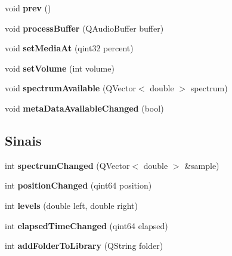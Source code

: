 \begin{DoxyCompactItemize}
\item 
\hypertarget{class_main_window_a56270e72e4ec5e058a040657932069cf}{void {\bfseries prev} ()}\label{class_main_window_a56270e72e4ec5e058a040657932069cf}

\item 
\hypertarget{class_main_window_a5c459d00d64786ef93db7670034af47d}{void {\bfseries process\-Buffer} (Q\-Audio\-Buffer buffer)}\label{class_main_window_a5c459d00d64786ef93db7670034af47d}

\item 
\hypertarget{class_main_window_aedb83314811efab4ea67c69cbce29aea}{void {\bfseries set\-Media\-At} (qint32 percent)}\label{class_main_window_aedb83314811efab4ea67c69cbce29aea}

\item 
\hypertarget{class_main_window_aeb9309a7fe8efd574fe5b7ac92ba2a92}{void {\bfseries set\-Volume} (int volume)}\label{class_main_window_aeb9309a7fe8efd574fe5b7ac92ba2a92}

\item 
\hypertarget{class_main_window_a9efd699e3eaed3396733475499297bc0}{void {\bfseries spectrum\-Available} (Q\-Vector$<$ double $>$ spectrum)}\label{class_main_window_a9efd699e3eaed3396733475499297bc0}

\item 
\hypertarget{class_main_window_ac7664400c470d7312a62ec8f4f7822a6}{void {\bfseries meta\-Data\-Available\-Changed} (bool)}\label{class_main_window_ac7664400c470d7312a62ec8f4f7822a6}

\end{DoxyCompactItemize}
\subsection*{Sinais}
\begin{DoxyCompactItemize}
\item 
\hypertarget{class_main_window_a0db59b0091efb9ef939245562e84b79a}{int {\bfseries spectrum\-Changed} (Q\-Vector$<$ double $>$ \&sample)}\label{class_main_window_a0db59b0091efb9ef939245562e84b79a}

\item 
\hypertarget{class_main_window_a8df9e5e5d0997eb8e5ecdbcf42bb57ca}{int {\bfseries position\-Changed} (qint64 position)}\label{class_main_window_a8df9e5e5d0997eb8e5ecdbcf42bb57ca}

\item 
\hypertarget{class_main_window_a59803bb114724dc5f3717dc28539f164}{int {\bfseries levels} (double left, double right)}\label{class_main_window_a59803bb114724dc5f3717dc28539f164}

\item 
\hypertarget{class_main_window_ad255b6b8019a66a663a9c1de04d42a80}{int {\bfseries elapsed\-Time\-Changed} (qint64 elapsed)}\label{class_main_window_ad255b6b8019a66a663a9c1de04d42a80}

\item 
\hypertarget{class_main_window_a659d33ceffcceae28005205fe44edda4}{int {\bfseries add\-Folder\-To\-Library} (Q\-String folder)}\label{class_main_window_a659d33ceffcceae28005205fe44edda4}

\end{DoxyCompactItemize}
